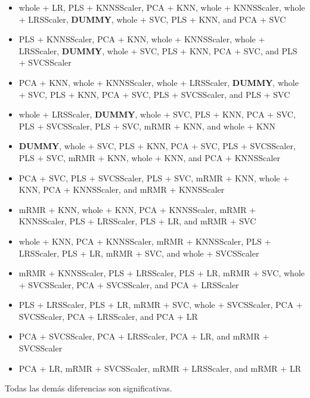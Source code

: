 \documentclass[a4paper,oneside,11pt,leqno]{article}
\begin{document}
	\begin{itemize}
		\item whole + LR, PLS + KNNSScaler, PCA + KNN, whole + KNNSScaler, whole + LRSScaler,  \textbf{DUMMY}, whole + SVC, PLS + KNN, and PCA + SVC

		\item PLS + KNNSScaler, PCA + KNN, whole + KNNSScaler, whole + LRSScaler,  \textbf{DUMMY}, whole + SVC, PLS + KNN, PCA + SVC, and PLS + SVCSScaler

		\item PCA + KNN, whole + KNNSScaler, whole + LRSScaler,  \textbf{DUMMY}, whole + SVC, PLS + KNN, PCA + SVC, PLS + SVCSScaler, and PLS + SVC

		\item whole + LRSScaler,  \textbf{DUMMY}, whole + SVC, PLS + KNN, PCA + SVC, PLS + SVCSScaler, PLS + SVC, mRMR + KNN, and whole + KNN

		\item  \textbf{DUMMY}, whole + SVC, PLS + KNN, PCA + SVC, PLS + SVCSScaler, PLS + SVC, mRMR + KNN, whole + KNN, and PCA + KNNSScaler

		\item PCA + SVC, PLS + SVCSScaler, PLS + SVC, mRMR + KNN, whole + KNN, PCA + KNNSScaler, and mRMR + KNNSScaler

		\item mRMR + KNN, whole + KNN, PCA + KNNSScaler, mRMR + KNNSScaler, PLS + LRSScaler, PLS + LR, and mRMR + SVC

		\item whole + KNN, PCA + KNNSScaler, mRMR + KNNSScaler, PLS + LRSScaler, PLS + LR, mRMR + SVC, and whole + SVCSScaler

		\item mRMR + KNNSScaler, PLS + LRSScaler, PLS + LR, mRMR + SVC, whole + SVCSScaler, PCA + SVCSScaler, and PCA + LRSScaler

		\item PLS + LRSScaler, PLS + LR, mRMR + SVC, whole + SVCSScaler, PCA + SVCSScaler, PCA + LRSScaler, and PCA + LR

		\item PCA + SVCSScaler, PCA + LRSScaler, PCA + LR, and mRMR + SVCSScaler

		\item PCA + LR, mRMR + SVCSScaler, mRMR + LRSScaler, and mRMR + LR
	\end{itemize}

	Todas las demás diferencias son significativas.
\end{document}

